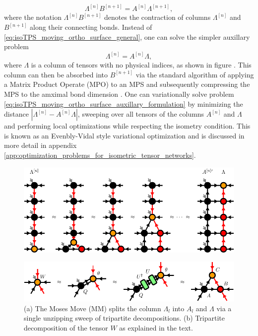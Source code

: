 \begin{equation}
	\label{eq:isoTPS_moving_ortho_surface_general}
	\Lambda^{[n]} B^{[n+1]} = A^{[n]} \Lambda^{[n+1]},
\end{equation}
where the notation $\Lambda^{[n]} B^{[n+1]}$ denotes the contraction of columns $\Lambda^{[n]}$ and $B^{[n+1]}$ along their connecting bonds. Instead of \eqref{eq:isoTPS_moving_ortho_surface_general}, one can solve the simpler auxillary problem
\begin{equation}
	\label{eq:isoTPS_moving_ortho_surface_auxillary_formulation}
	\Lambda^{[n]} = A^{[n]} \Lambda,
\end{equation}
where $\Lambda$ is a column of tensors with no physical indices, as shown in figure . This column can then be absorbed into $B^{[n+1]}$ via the standard algorithm of applying a Matrix Product Operate (MPO) to an MPS and subsequently compressing the MPS to the amximal bond dimension \cite{cite:DMRG_in_the_age_of_MPS}. One can variationally solve problem \eqref{eq:isoTPS_moving_ortho_surface_auxillary_formulation} by minimizing the distance $\left\lvert\Lambda^{[n]}-A^{[n]}\Lambda\right\rvert$, sweeping over all tensors of the columns $A^{[n]}$ and $\Lambda$ and performing local optimizations while respecting the isometry condition. This is known as an Evenbly-Vidal style variational optimization and is discussed in more detail in appendix \ref{app:optimization_problems_for_isometric_tensor_networks}.
\begin{figure}
	\centering
	\subcaptionbox{\label{fig:Moses_move}}
	{%
		\includegraphics[scale=1]{figures/tikz/Tensor_Networks/isoTPS_MM/isoTPS_MM_a.pdf}
	}
	\par\medskip
	\subcaptionbox{\label{fig:tripartite_decomposition}}
	{%
		\includegraphics[scale=1]{figures/tikz/Tensor_Networks/isoTPS_MM/isoTPS_MM_b.pdf}
		
	}
	\caption{(a) The Moses Move (MM) splits the column $\Lambda_l$ into $A_l$ and $\Lambda$ via a single unzipping sweep of tripartite decompositions. (b) Tripartite decomposition of the tensor $W$ as explained in the text.}
	\label{fig:Moses_move_and_tripartite_decomposition}
\end{figure}
